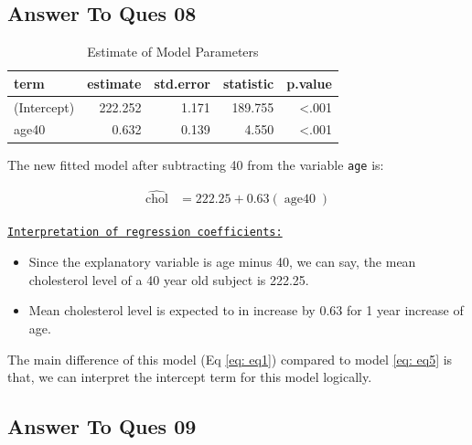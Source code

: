\documentclass[
  12pt,
  oneside]{article}
\providecommand{\tightlist}{%
  \setlength{\itemsep}{0pt}\setlength{\parskip}{0pt}}
\begin{document}
\clearpage

\hypertarget{answer-to-ques-08}{%
\subsection{Answer To Ques 08}\label{answer-to-ques-08}}

\begin{table}[H]

\caption{\label{tab:Table-10}Estimate of Model Parameters}
\centering
\begin{tabular}[t]{lrrrr}
\toprule
term & estimate & std.error & statistic & p.value\\
\midrule
(Intercept) & 222.252 & 1.171 & 189.755 & <.001\\
age40 & 0.632 & 0.139 & 4.550 & <.001\\
\bottomrule
\end{tabular}
\end{table}

The new fitted model after subtracting 40 from the variable \texttt{age} is:

\begin{equation}
\label{eq: eq5}
\begin{aligned}
\operatorname{\widehat{chol}} &= 222.25 + 0.63(\operatorname{age40})
\end{aligned}
\end{equation}

\underline{\texttt{Interpretation of regression coefficients:}}

\begin{itemize}
\tightlist
\item
  Since the explanatory variable is age minus 40, we can say, the mean cholesterol level of a 40 year old subject is 222.25.
\item
  Mean cholesterol level is expected to in increase by 0.63 for 1 year increase of age.
\end{itemize}

The main difference of this model (Eq \ref{eq: eq1}) compared to model \ref{eq: eq5} is that, we can interpret the intercept term for this model logically.

\clearpage

\hypertarget{answer-to-ques-09}{%
\subsection{Answer To Ques 09}\label{answer-to-ques-09}}
\end{document}
